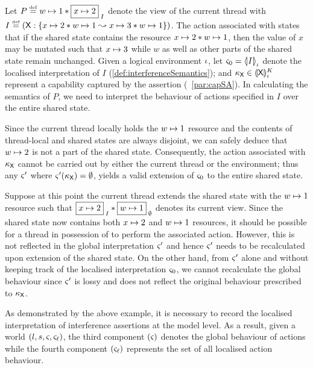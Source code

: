 \begin{example}[]Let $P \eqdef \cell{w}{1} * \shared{\cell{x}{2}}{I}$ denote the view of the current thread with $I \eqdef \left(\token{X}: \left\{\cell{x}{2} * \cell{w}{1} \swap \cell{x}{3} * \cell{w}{1}\right\}\right)$. The action associated with  states that if the shared state contains the resource $\cell{x}{2} * \cell{w}{1}$, then the value of $x$ may be mutated such that $\cell{x}{3}$ while $w$ as well as other parts of the shared state remain unchanged. Given a logical environment $\lenv$, let $\amod{0} = \semI[\lenv]{I}$ denote the localised interpretation of $I$ (\ref{def:interferenceSemantics}); and $\ca{\textsf{X}} \in  \semK[\lenv]{\token{X}}$ represent a capability captured by the assertion  (\param~\ref{par:capSA}). In calculating the semantics of $P$, we need to interpret the behaviour of actions specified in $I$ over the entire shared state.

Since the current thread locally holds the $\cell{w}{1}$ resource and the contents of thread-local and shared states are always disjoint, we can safely deduce that $\cell{w}{2}$ is not a part of the shared state. Consequently, the action associated with $\ca{\textsf{X}}$ cannot be carried out by either the current thread or the environment; thus any $\amod{}'$ where $\amod{}'(\ca{\textsf{X}}) = \emptyset$, yields a valid extension of $\amod{0}$ to the entire shared state.

Suppose at this point the current thread extends the shared state with the $\cell{w}{1}$ resource such that $\shared{\cell{x}{2}}{I} * \shared{\cell{w}{1}}{\emptyset}$ denotes its current view. Since the shared state now contains both $\cell{x}{2}$ and $\cell{w}{1}$ resources, it should be possible for a thread in possession of  to perform the associated action. However, this is not reflected in the global interpretation $\amod{}'$ and hence $\amod{}'$ needs to be recalculated upon extension of the shared state. On the other hand, from $\amod{}'$ alone and without keeping track of the localised interpretation $\amod{0}$, we cannot recalculate the global behaviour since $\amod{}'$ is lossy and does not reflect the original behaviour prescribed to $\ca{\textsf{X}}$.
\end{example}
%
%
As demonstrated by the above example, it is necessary to record the localised interpretation of interference assertions at the model level. As a result, given a world $(l, s, \amod{}, \amod{\ell})$, the third component $(\amod{})$ denotes the global behaviour of actions while the fourth component $(\amod{\ell})$ represents the set of all localised action behaviour.
